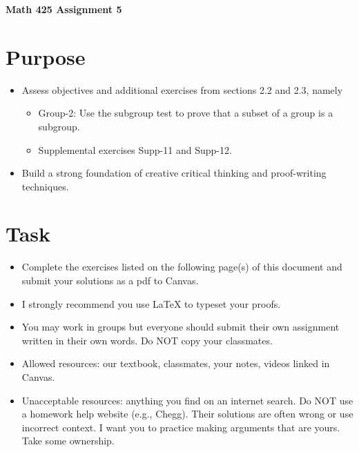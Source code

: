 \documentclass[12pt]{article}
\begin{document}
	\begin{center}
		{\Large \bf Math 425 Assignment 5}
	\end{center}
	\section*{Purpose}
	\begin{itemize}
		\item Assess objectives and additional exercises from sections 2.2 and 2.3, namely
		\begin{itemize}
			\item Group-2: Use the subgroup test to prove that a subset of a group is a subgroup.
			\item Supplemental exercises Supp-11 and Supp-12.
		\end{itemize}
		\item Build a strong foundation of creative critical thinking and proof-writing techniques.
	\end{itemize}
	\section*{Task}
	\begin{itemize}
		\item Complete the exercises listed on the following page(s) of this document and submit your solutions as a pdf to Canvas.
		\item I strongly recommend you use LaTeX to typeset your proofs.
		\item You may work in groups but everyone should submit their own assignment written in their own words.  Do NOT copy your classmates.
		\item Allowed resources: our textbook, classmates, your notes, videos linked in Canvas.
		\item Unacceptable resources: anything you find on an internet search. Do NOT use a homework help website (e.g., Chegg). Their solutions are often wrong or use incorrect context.  I want you to practice making arguments that are yours. Take some ownership.
	\end{itemize}
\end{document}
